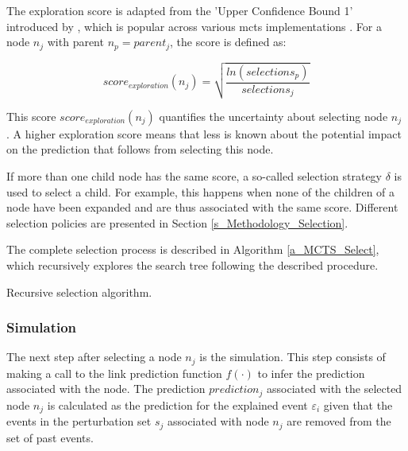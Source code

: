 The exploration score is adapted from the 'Upper Confidence Bound 1' introduced by \cite{auer_finite-time_2002}, which is popular across various \gls{mcts} implementations \cite{kocsis_bandit_2006, browne_survey_2012}. For a node $n_j$ with parent $n_p = parent_j$, the score is defined as:

\begin{equation}
    score_{exploration}(n_j) = \sqrt{\frac{ln(selections_p)}{selections_j}}
\end{equation}

This score $score_{exploration}(n_j)$ quantifies the uncertainty about selecting node $n_j$ \cite{auer_finite-time_2002, browne_survey_2012}. A higher exploration score means that less is known about the potential impact on the prediction that follows from selecting this node.

If more than one child node has the same score, a so-called selection strategy $\delta$ is used to select a child. For example, this happens when none of the children of a node have been expanded and are thus associated with the same score. Different selection policies are presented in Section \ref{s_Methodology_Selection}. 

The complete selection process is described in Algorithm \ref{a_MCTS_Select}, which recursively explores the search tree following the described procedure.

{
\setlength{\algomargin}{1.25em}
\small
\begin{algorithm}[ht]
\caption{Recursive selection algorithm.}
\label{a_MCTS_Select}
\end{algorithm}
}


\subsubsection{Simulation}
\label{s_Methodology_Search_Simulation}
The next step after selecting a node $n_j$ is the simulation. This step consists of making a call to the link prediction function $f(\cdot)$ to infer the prediction associated with the node. The prediction $prediction_j$ associated with the selected node $n_j$ is calculated as the prediction for the explained event $\varepsilon_i$ given that the events in the perturbation set $s_j$ associated with node $n_j$ are removed from the set of past events. 

